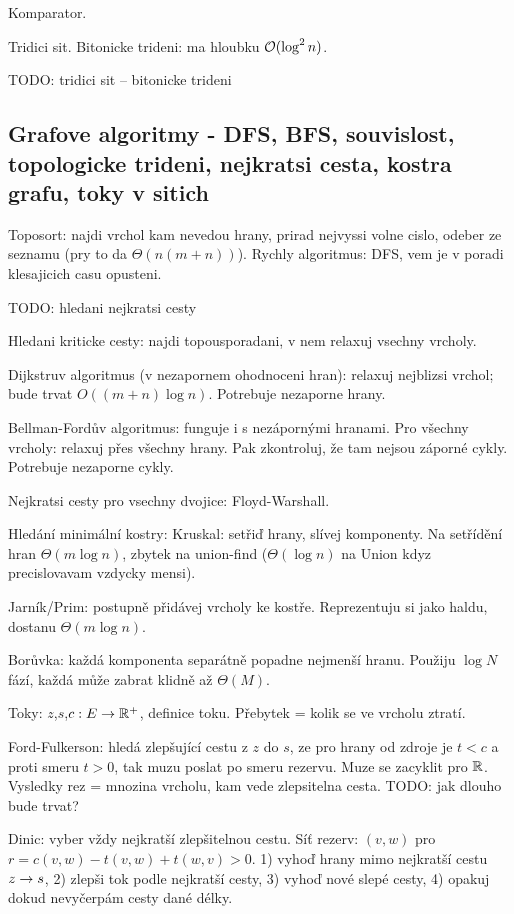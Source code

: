 Komparator.

Tridici sit. Bitonicke trideni: ma hloubku $\mathcal{O}(\log^2 n)$.

TODO: tridici sit -- bitonicke trideni

\subsection{Grafove algoritmy - DFS, BFS, souvislost, topologicke trideni,
nejkratsi cesta, kostra grafu, toky v sitich}

Toposort: najdi vrchol kam nevedou hrany, prirad nejvyssi volne cislo, odeber
ze seznamu (pry to da $\Theta(n(m+n))$).
Rychly algoritmus: DFS, vem je v poradi klesajicich casu opusteni.

TODO: hledani nejkratsi cesty

Hledani kriticke cesty: najdi topousporadani, v nem relaxuj vsechny vrcholy.

Dijkstruv algoritmus (v nezapornem ohodnoceni hran):
relaxuj nejblizsi vrchol; bude trvat $O((m+n) \log n)$. Potrebuje nezaporne
hrany.

Bellman-Fordův algoritmus: funguje i s nezápornými hranami.
Pro všechny vrcholy: relaxuj přes všechny hrany.
Pak zkontroluj, že tam nejsou záporné cykly. Potrebuje nezaporne cykly.

Nejkratsi cesty pro vsechny dvojice: Floyd-Warshall.

Hledání minimální kostry: Kruskal: setřiď hrany, slívej komponenty.
Na setřídění hran $\Theta(m\log n)$, zbytek na union-find ($\Theta(\log n)$ na
Union kdyz precislovavam vzdycky mensi).

Jarník/Prim: postupně přidávej vrcholy ke kostře. Reprezentuju si jako
haldu, dostanu $\Theta(m\log n)$.

Borůvka: každá komponenta separátně popadne nejmenší hranu. Použiju $\log N$
fází, každá může zabrat klidně až $\Theta(M)$.

Toky: $z$,$s$,$c:E\rightarrow\mathbb{R}^+$, definice toku. Přebytek = kolik se ve vrcholu
ztratí.

Ford-Fulkerson: hledá zlepšující cestu z $z$ do $s$, ze pro hrany od zdroje je
$t<c$ a proti smeru $t>0$, tak muzu poslat po smeru rezervu. Muze se zacyklit
pro $\mathbb{R}$. Vysledky rez = mnozina vrcholu, kam vede zlepsitelna cesta.
TODO: jak dlouho bude trvat?

Dinic: vyber vždy nejkratší zlepšitelnou cestu. Síť rezerv: $(v,w)$ pro
$r=c(v,w)-t(v,w)+t(w,v)>0$.
1) vyhoď hrany mimo nejkratší cestu $z\rightarrow s$,
2) zlepši tok podle nejkratší cesty,
3) vyhoď nové slepé cesty,
4) opakuj dokud nevyčerpám cesty dané délky.

